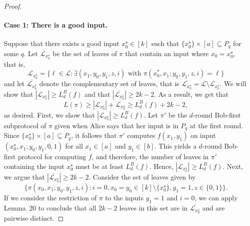 \begin{proof}
\paragraph{Case 1: There is a good input.} Suppose that there exists a good input $x_0^\star\in[k]$ such that $\{x_0^\star\}\times[a]\subseteq P_q$ for some $q$. Let $\mathcal L_{x_0^\star}$ be the set of leaves of $\pi$ that contain an input where $x_0=x_0^\star$, that is,
\[\mathcal L_{x_0^\star}=\{\ell\in\mathcal L:\exists(x_1,y_0,y_1,z,i)\text{ with }\pi(x_0^*,x_1;y_0,y_1,z,i)=\ell\}\]
and let $\overline{\mathcal L_{x_0^\star}}$ denote the complementary set of leaves, that is $\overline{\mathcal L_{x_0^\star}}=\mathcal L\setminus\mathcal L_{x_0^\star}$. We will show that $|\mathcal L_{x_0^\star}|\ge L_d^B(f)$ and that $|\overline{\mathcal L_{x_0^\star}}|\ge2k-2$. As a result, we get that
\[L(\pi)\ge|\mathcal L_{x_0^\star}|+\overline{\mathcal L_{x_0^\star}}\ge L_d^B(f)+2k-2,\]
as desired.
First, we show that $|\mathcal L_{x_0^\star}|\ge L_d^B(f)$. Let $\pi'$ be the $d$-round Bob-first subprotocol of $\pi$ given when Alice says that her input is in $P_q$ at the first round. Since $\{x_0^\star\}\times[a]\subseteq P_q$, it follows that $\pi'$ computes $f(x_1,y_1)$ on input $(x_0^\star,x_1;y_0,y_1,0,1)$ for all $x_1\in[a]$ and $y_1\in[b]$. This yields a $d$-round Bob-first protocol for computing $f$, and therefore, the number of leaves in $\pi'$ containing the input $x_0^\star$ must be at least $L_d^B(f)$. Hence, $|\mathcal L_{x_0^\star}|\ge L_d^B(f)$.
Next, we argue that $|\overline{\mathcal L_{x_0^\star}}|\ge2k-2$. Consider the set of leaves given by
\[\{\pi(x_0,x_1;y_0,y_1,z,i):i=0,x_0=y_0\in[k]\setminus\{x_0^\star\},y_1=1,z\in\{0,1\}\}.\]
If we consider the restriction of $\pi$ to the inputs $y_1=1$ and $i=0$, we can apply Lemma~20 to conclude that all $2k-2$ leaves in this set are in $\overline{\mathcal L_{x_0^\star}}$ and are pairwise distinct.

\end{proof}
